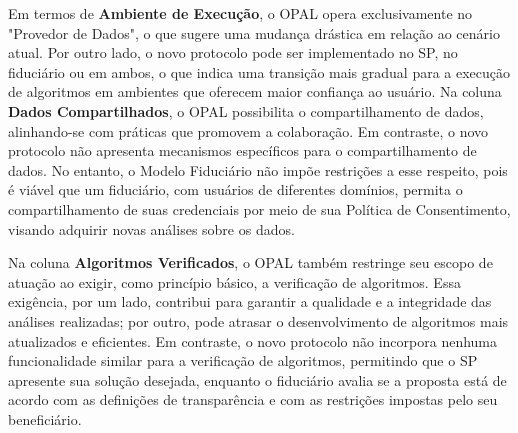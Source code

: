 Em termos de \textbf{Ambiente de Execução}, o \acs{OPAL} opera exclusivamente no "Provedor de Dados", o que sugere uma mudança drástica em relação ao cenário atual. Por outro lado, o novo protocolo pode ser implementado no SP, no fiduciário ou em ambos, o que indica uma transição mais gradual para a execução de algoritmos em ambientes que oferecem maior confiança ao usuário. Na coluna \textbf{Dados Compartilhados}, o \acs{OPAL} possibilita o compartilhamento de dados, alinhando-se com práticas que promovem a colaboração. Em contraste, o novo protocolo não apresenta mecanismos específicos para o compartilhamento de dados. No entanto, o Modelo Fiduciário não impõe restrições a esse respeito, pois é viável que um fiduciário, com usuários de diferentes domínios, permita o compartilhamento de suas credenciais por meio de sua Política de Consentimento, visando adquirir novas análises sobre os dados.

Na coluna \textbf{Algoritmos Verificados}, o \acs{OPAL} também restringe seu escopo de atuação ao exigir, como princípio básico, a verificação de algoritmos. Essa exigência, por um lado, contribui para garantir a qualidade e a integridade das análises realizadas; por outro, pode atrasar o desenvolvimento de algoritmos mais atualizados e eficientes. Em contraste, o novo protocolo não incorpora nenhuma funcionalidade similar para a verificação de algoritmos, permitindo que o \acs{SP} apresente sua solução desejada, enquanto o fiduciário avalia se a proposta está de acordo com as definições de transparência e com as restrições impostas pelo seu beneficiário.




